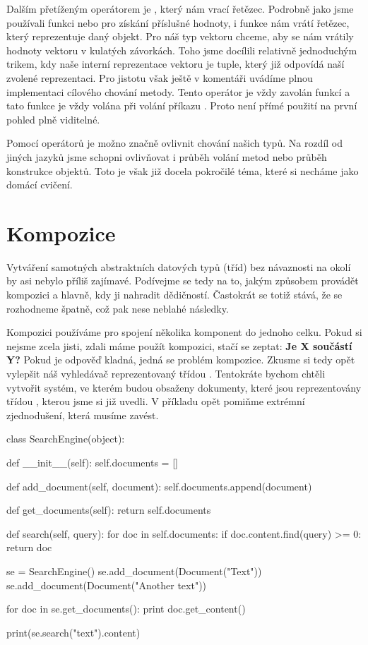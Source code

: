 Dalším přetíženým operátorem je , který nám vrací řetězec. Podrobně jako jsme používali
funkci  nebo  pro získání příslušné hodnoty, i funkce  nám vrátí řetězec,
který reprezentuje daný objekt. Pro náš typ vektoru chceme, aby se nám vrátily hodnoty vektoru v kulatých
závorkách. Toho jsme docílili relativně jednoduchým trikem, kdy naše interní reprezentace vektoru je tuple,
který již odpovídá naší zvolené reprezentaci. Pro jistotu však ještě v komentáři uvádíme plnou implementaci
cílového chování metody. Tento operátor je vždy zavolán funkcí  a tato funkce je vždy volána
při volání příkazu . Proto není přímé použití na první pohled plně viditelné.

Pomocí operátorů je možno značně ovlivnit chování našich typů. Na rozdíl od jiných jazyků jsme schopni
ovlivňovat i průběh volání metod nebo průběh konstrukce objektů. Toto je však již docela pokročilé téma,
které si necháme jako domácí cvičení.

\section{Kompozice}

Vytváření samotných abstraktních datových typů (tříd) bez návaznosti na okolí by asi nebylo příliš zajímavé.
Podívejme se tedy na to, jakým způsobem provádět kompozici a hlavně, kdy ji nahradit dědičností. Častokrát
se totiž stává, že se rozhodneme špatně, což pak nese neblahé následky.

Kompozici používáme pro spojení několika komponent do jednoho celku. Pokud si nejsme zcela jisti,
zdali máme použít kompozici, stačí se zeptat: \textbf{Je X součástí Y?} Pokud je odpověď kladná, jedná
se problém kompozice. Zkusme si tedy opět vylepšit náš vyhledávač reprezentovaný třídou .
Tentokráte bychom chtěli vytvořit
systém, ve kterém budou obsaženy dokumenty, které jsou reprezentovány třídou , kterou jsme si
již uvedli. V příkladu opět pomiňme extrémní zjednodušení, která musíme zavést.

\begin{python}
class SearchEngine(object):

    def __init__(self):
        self.documents = []

    def add_document(self, document):
        self.documents.append(document)

    def get_documents(self):
        return self.documents

    def search(self, query):
        for doc in self.documents:
            if doc.content.find(query) >= 0:
                return doc

se = SearchEngine()
se.add_document(Document("Text"))
se.add_document(Document("Another text"))

for doc in se.get_documents():
    print doc.get_content()

print(se.search("text").content)
\end{python}

